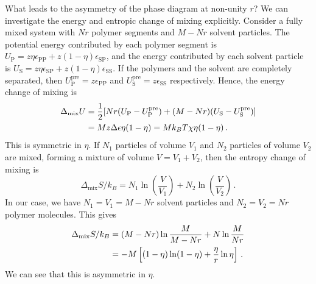 \documentclass{article}
\theoremstyle{plain}\theoremheaderfont{\normalfont\bfseries}\theorembodyfont{\rmfamily}\theoremseparator{.}\newtheorem*{thm}{Theorem}\newtheorem*{law}{Law}\newtheorem*{pos}{Postulate}
\numberwithin{equation}{section}
\begin{document}
    What leads to the asymmetry of the phase diagram at non-unity \(r\)? We can investigate the energy and entropic change of mixing explicitly. Consider a fully mixed system with \(Nr\) polymer segments and \(M-Nr\) solvent particles. The potential energy contributed by each polymer segment is \(U_{\text{P}}=z\eta\epsilon_{\text{PP}}+z(1-\eta)\epsilon_{\text{SP}}\), and the energy contributed by each solvent particle is \(U_{\text{S}}=z\eta\epsilon_{\text{SP}}+z(1-\eta)\epsilon_{\text{SS}}\). If the polymers and the solvent are completely separated, then \(U_{\text{P}}^{\text{pre}}=z\epsilon_{\text{PP}}\) and \(U_{\text{S}}^{\text{pre}}=z\epsilon_{\text{SS}}\) respectively. Hence, the energy change of mixing is
    \begin{align}
        \Delta_{\text{mix}}U&=\frac{1}{2}[Nr(U_{\text{P}}-U_{\text{P}}^{\text{pre}})+(M-Nr)(U_{\text{S}}-U_{\text{S}}^{\text{pre}})]\notag\\
        &=Mz\Delta\epsilon\eta(1-\eta)=Mk_B T\chi\eta(1-\eta)\,.
    \end{align}
    This is symmetric in \(\eta\). If \(N_1\) particles of volume \(V_1\) and \(N_2\) particles of volume \(V_2\) are mixed, forming a mixture of volume \(V=V_1+V_2\), then the entropy change of mixing is
    \begin{equation}
        \Delta_{\text{mix}}S/k_B=N_1\ln\left(\frac{V}{V_1}\right)+N_2\ln\left(\frac{V}{V_2}\right)\,.
    \end{equation}
    In our case, we have \(N_1=V_1=M-Nr\) solvent particles and \(N_2=V_2=Nr\) polymer molecules. This gives
    \begin{align}
        \Delta_{\text{mix}}S/k_B&=(M-Nr)\ln\frac{M}{M-Nr}+N\ln\frac{M}{Nr}\notag\\
        &=-M\left[(1-\eta)\ln(1-\eta)+\frac{\eta}{r}\ln\eta\right]\,.
    \end{align} 
    We can see that this is asymmetric in \(\eta\).
\end{document}
